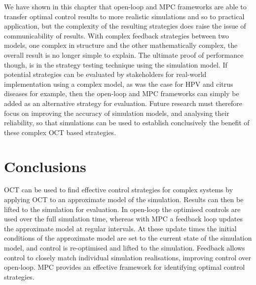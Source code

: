 We have shown in this chapter that open-loop and MPC frameworks are able to transfer optimal control results to more realistic simulations and so to practical application, but the complexity of the resulting strategies does raise the issue of communicability of results. With complex feedback strategies between two models, one complex in structure and the other mathematically complex, the overall result is no longer simple to explain. The ultimate proof of performance though, is in the strategy testing technique using the simulation model. If potential strategies can be evaluated by stakeholders for real-world implementation using a complex model, as was the case for HPV \citep{choi_transmission_2010} and citrus diseases \citep{cunniffe_optimising_2015} for example, then the open-loop and MPC frameworks can simply be added as an alternative strategy for evaluation. Future research must therefore focus on improving the accuracy of simulation models, and analysing their reliability, so that simulations can be used to establish conclusively the benefit of these complex OCT based strategies.

\section{Conclusions}

OCT can be used to find effective control strategies for complex systems by applying OCT to an approximate model of the simulation. Results can then be lifted to the simulation for evaluation. In open-loop the optimised controls are used over the full simulation time, whereas with MPC a feedback loop updates the approximate model at regular intervals. At these update times the initial conditions of the approximate model are set to the current state of the simulation model, and control is re-optimised and lifted to the simulation. Feedback allows control to closely match individual simulation realisations, improving control over open-loop. MPC provides an effective framework for identifying optimal control strategies.
